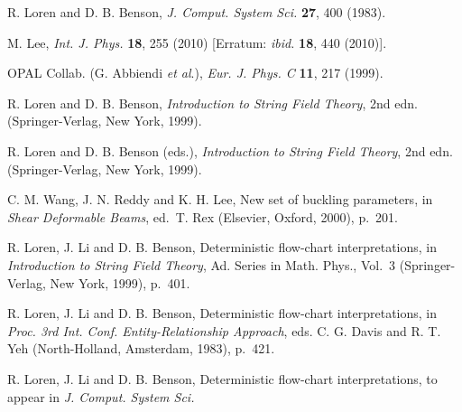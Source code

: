 \documentclass{ws-ijmpa}
\begin{document}
\begin{thebibliography}{0}    %

 R. Loren and D. B. Benson, {\it J. Comput.
System Sci.} {\bf 27}, 400 (1983).

 M. Lee, {\it Int. J. Phys.} {\bf 18}, 255 (2010) [Erratum: {\it ibid.} {\bf18}, 440 (2010)].

 OPAL Collab. (G. Abbiendi {\it et al}.),
{\it Eur. J. Phys. C\/} {\bf 11}, 217 (1999).

 R. Loren and D. B. Benson, {\it Introduction to String
Field Theory}, 2nd edn. (Springer-Verlag, New York, 1999).

 R. Loren and D. B. Benson (eds.), {\it Introduction to
String Field Theory}, 2nd edn. (Springer-Verlag, New York, 1999).

 C. M. Wang, J. N. Reddy and K. H. Lee, New set of
buckling parameters, in {\it Shear Deformable Beams}, ed.~T. Rex
(Elsevier, Oxford, 2000), p.~201.

 R. Loren, J. Li and D. B. Benson, Deterministic flow-chart
interpretations, in {\it Introduction to String Field Theory},
Ad. Series in Math. Phys., Vol.~3 (Springer-Verlag, New York, 1999),
p.~401.

 R. Loren, J. Li and D. B. Benson, Deterministic
flow-chart interpretations, in {\it Proc. 3rd Int. Conf.
Entity-Relationship Approach}, eds. C. G. Davis and R. T. Yeh
(North-Holland, Amsterdam, 1983), p.~421.

 R. Loren, J. Li and D. B. Benson, Deterministic
flow-chart interpretations, to appear in {\it J. Comput. System Sci.}
\end{thebibliography}
\end{document}
